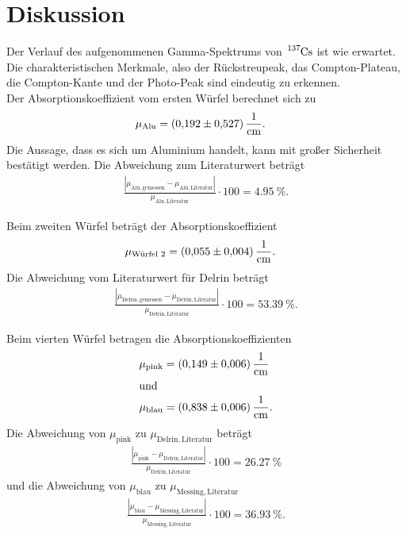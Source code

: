 \section{Diskussion}
\label{sec:Diskussion}

Der Verlauf des aufgenommenen Gamma-Spektrums von $\ce{^{137}Cs}$ ist wie erwartet.
Die charakteristischen Merkmale, also der Rückstreupeak, das Compton-Plateau, die Compton-Kante und der Photo-Peak sind eindeutig zu erkennen.\\

Der Absorptionskoeffizient vom ersten Würfel berechnet sich zu
\begin{align*}
    \mu_{\text{Alu}} &= \qty{0.192 \pm 0.527}{\per\centi\meter}.
\end{align*}
Die Aussage, dass es sich um Aluminium handelt, kann mit großer Sicherheit bestätigt werden.
Die Abweichung zum Literaturwert beträgt
\begin{align*}
   \frac{|\mu_\mathrm{Alu, gemessen}-\mu_\mathrm{Alu, Literatur}|}{\mu_\mathrm{Alu, Literatur}} \cdot 100 = \qty{4.95}{\percent}.
\end{align*}

Beim zweiten Würfel beträgt der Absorptionskoeffizient
\begin{align*}
    \mu_{\text{Würfel 2}} &= \qty{0.055 \pm 0.004}{\per\centi\meter}.
\end{align*}
Die Abweichung vom Literaturwert für Delrin beträgt
\begin{align*}
    \frac{|\mu_\mathrm{Delrin, gemessen}-\mu_\mathrm{Delrin, Literatur}|}{\mu_\mathrm{Delrin, Literatur}} \cdot 100 = \qty{53.39}{\percent}.
\end{align*}

Beim vierten Würfel betragen die Absorptionskoeffizienten
\begin{align*}
    \mu_{\mathrm{pink}} &= \qty{0.149 \pm 0.006}{\per\centi\meter} \\
    \shortintertext{und}
    \mu_{\mathrm{blau}} &= \qty{0.838 \pm 0.006}{\per\centi\meter}.
\end{align*}
Die Abweichung von $\mu_{\mathrm{pink}}$ zu $\mu_{\mathrm{Delrin, Literatur}}$ beträgt 
\begin{align*}
    \frac{|\mu_{\mathrm{pink}}-\mu_\mathrm{Delrin, Literatur}|}{\mu_\mathrm{Delrin, Literatur}} \cdot 100 = \qty{26.27}{\percent}
\end{align*}
und die Abweichung von $\mu_{\mathrm{blau}}$ zu $\mu_{\mathrm{Messing, Literatur}}$
\begin{align*}
    \frac{|\mu_{\mathrm{blau}}-\mu_\mathrm{Messing, Literatur}|}{\mu_\mathrm{Messing, Literatur}} \cdot 100 = \qty{36.93}{\percent}.
\end{align*}

